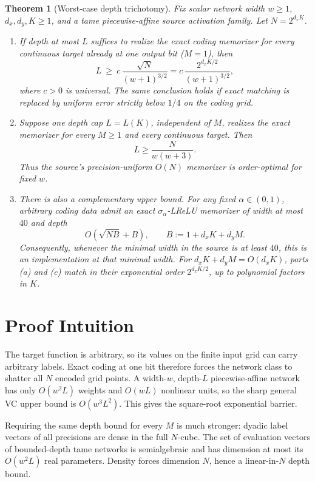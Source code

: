 \documentclass[10pt]{article}
\newtheorem{theorem}{Theorem}
\begin{document}
\begin{theorem}[Worst-case depth trichotomy]
\label{thm:main}
Fix scalar network width $w\ge1$, $d_x,d_y,K\ge1$, and a tame
piecewise-affine source activation family.  Let $N=2^{d_xK}$.

\begin{enumerate}
\item[(a)] If depth at most $L$ suffices to realize the exact coding
memorizer for every continuous target already at one output bit
($M=1$), then
\[
       L\ \ge\ c\,\frac{\sqrt N}{(w+1)^{3/2}}
       =c\,\frac{2^{d_xK/2}}{(w+1)^{3/2}},
\]
where $c>0$ is universal.  The same conclusion holds if exact matching is
replaced by uniform error strictly below $1/4$ on the coding grid.

\item[(b)] Suppose one depth cap $L=L(K)$, independent of $M$, realizes
the exact memorizer for every $M\ge1$ and every continuous target.  Then
\[
             L\ge \frac{N}{w(w+3)}.
\]
Thus the source's precision-uniform $O(N)$ memorizer is order-optimal for
fixed $w$.

\item[(c)] There is also a complementary upper bound.  For any fixed
\(\alpha\in(0,1)\), arbitrary coding data admit an exact
\(\sigma_\alpha\)-LReLU memorizer of width at most $40$ and depth
\[
 O\!\left(\sqrt{N B}+B\right),
 \qquad B:=1+d_xK+d_yM.
\]
Consequently, whenever the minimal width in the source is at least $40$,
this is an implementation \emph{at that minimal width}.  For
\(d_xK+d_yM=O(d_xK)\), parts (a) and (c) match in their exponential order
\(2^{d_xK/2}\), up to polynomial factors in $K$.
\end{enumerate}
\end{theorem}

\section*{Proof Intuition}

The target function is arbitrary, so its values on the finite input grid can
carry arbitrary labels.  Exact coding at one bit therefore forces the network
class to shatter all $N$ encoded grid points.  A width-$w$, depth-$L$
piecewise-affine network has only $O(w^2L)$ weights and $O(wL)$ nonlinear
units, so the sharp general VC upper bound is $O(w^3L^2)$.  This gives the
square-root exponential barrier.

Requiring the same depth bound for every $M$ is much stronger: dyadic label
vectors of all precisions are dense in the full $N$-cube.  The set of
evaluation vectors of bounded-depth tame networks is semialgebraic and has
dimension at most its $O(w^2L)$ real parameters.  Density forces dimension
$N$, hence a linear-in-$N$ depth bound.
\end{document}
